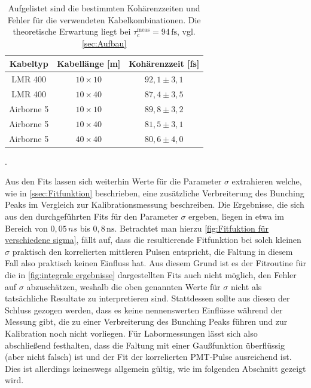 \begin{table}[h]
    \centering
    \begin{tabular}{|c|c|c|} \hline
        Kabeltyp    & Kabellänge [m] & Kohärenzzeit [fs]  \\\hline
        LMR 400     & $10\times 10$  & $92{,}1 \pm 3{,}1$ \\\hline
        LMR 400     & $10\times 40$  & $87{,}4 \pm 3{,}5$ \\\hline
        Airborne 5  & $10\times 10$  & $89{,}8 \pm 3{,}2$ \\\hline
        Airborne 5  & $10\times 40$  & $81{,}5 \pm 3{,}1$ \\\hline
        Airborne 5  & $40\times 40$  & $80{,}6 \pm 4{,}0$ \\\hline
    \end{tabular}
    \caption{Aufgelistet sind die bestimmten Kohärenzzeiten und Fehler für die verwendeten Kabelkombinationen. Die theoretische Erwartung liegt bei $\tau_c^{\mathrm{meas}}=94\,\mathrm{fs}$, vgl. \autoref{sec:Aufbau}}.
    \label{tab:gemessene Kohärenzzeiten}
\end{table}
Aus den Fits lassen sich weiterhin Werte für die Parameter $\sigma$ extrahieren welche, wie in \autoref{ssec:Fitfunktion} beschrieben, eine zusätzliche Verbreiterung des Bunching Peaks im Vergleich zur Kalibrationsmessung beschreiben. 
Die Ergebnisse, die sich aus den durchgeführten Fits für den Parameter $\sigma$ ergeben, liegen in etwa im Bereich von $0{,}05\,ns$ bis $0{,}8\,\mathrm{ns}$. 
Betrachtet man hierzu \autoref{fig:Fitfuktion für verschiedene sigma}, fällt auf, dass die resultierende Fitfunktion bei solch kleinen $\sigma$ praktisch den korrelierten mittleren Pulsen entspricht, die Faltung in diesem Fall also praktisch keinen Einfluss hat. 
Aus diesem Grund ist es der Fitroutine für die in \autoref{fig:integrale ergebnisse} dargestellten Fits auch nicht möglich, den Fehler auf $\sigma$ abzuschätzen, weshalb die oben genannten Werte für $\sigma$ nicht als tatsächliche Resultate zu interpretieren sind. 
Stattdessen sollte aus diesen der Schluss gezogen werden, dass es keine nennenswerten Einflüsse während der Messung gibt, die zu einer Verbreiterung des Bunching Peaks führen und zur Kalibration noch nicht vorliegen. 
Für Labormessungen lässt sich also abschließend festhalten, dass die Faltung mit einer Gaußfunktion überflüssig (aber nicht falsch) ist und der Fit der korrelierten PMT-Pulse ausreichend ist. 
Dies ist allerdings keineswegs allgemein gültig, wie im folgenden Abschnitt gezeigt wird.

